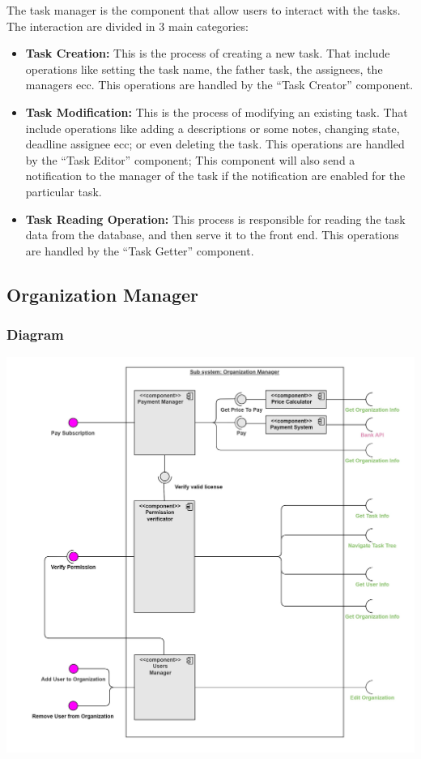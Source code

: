 \documentclass{article}
\begin{document}
The task manager is the component that allow users to interact with the tasks.
The interaction are divided in 3 main categories:
\begin{itemize}
    \item \textbf{Task Creation: }
    This is the process of creating a new task. That include operations like 
    setting the task name, the father task, the assignees, the managers ecc.
    This operations are handled by the ``Task Creator'' component.
    \item \textbf{Task Modification: }
    This is the process of modifying an existing task. That include operations like adding a descriptions or some notes,
    changing state, deadline assignee ecc; or even deleting the task.
    This operations are handled by the ``Task Editor'' component; This component will also send a notification to the manager of the task
    if the notification are enabled for the particular task.
    \item \textbf{Task Reading Operation: }
    This process is responsible for reading the task data from the database, and then serve it to the front end.
    This operations are handled by the ``Task Getter'' component.
\end{itemize}


\subsection{Organization Manager}
\subsubsection{Diagram}
\includegraphics[width=\textwidth,height=\textheight,keepaspectratio]{images/component_diagram/organization_manager.jpg}
\end{document}
